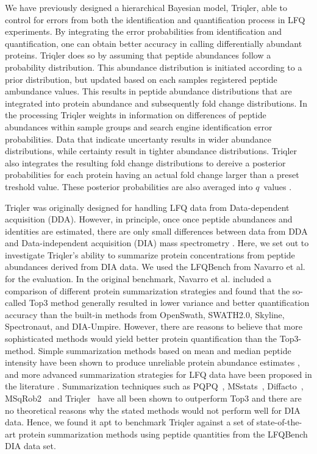 \documentclass[10pt,letterpaper]{article}
\begin{document}
We have previously designed a hierarchical Bayesian model, Triqler, able to control for errors from both the identification and quantification process in LFQ experiments\cite{the2019integrated}. By integrating the error probabilities from identification and quantification, one can obtain better accuracy in calling differentially abundant proteins. Triqler does so by assuming that peptide abundances follow a probability distribution. This abundance distribution is initiated according to a prior distribution, but updated based on each samples registered peptide ambundance values. This results in peptide abundance distributions that are integrated into protein abundance and subsequently fold change distributions. In the processing Triqler weights in information on differences of peptide abundances within sample groups and search engine identification error probabilities. Data that indicate uncertanty results in wider abundance distributions, while certainty result in tighter abundance distributions. Triqler also integrates the resulting fold change distributions to dereive a posterior probabilities for each protein having an actual fold change larger than a preset treshold value. These posterior probabilities are also averaged into $q$~values \cite{the2019integrated}.

Triqler was originally designed for handling LFQ data from Data-dependent acquisition (DDA). However, in principle, once once peptide abundances and identities are estimated, there are only small differences between data from DDA and Data-independent acquisition (DIA) mass spectrometry \cite{venable2004automated}. Here, we set out to investigate Triqler's ability to summarize protein concentrations from peptide abundances derived from DIA data. We used the LFQBench from Navarro et al. \cite{navarro2016multicenter} for the evaluation. In the original benchmark, Navarro et al. included a comparison of different protein summarization strategies and found that the so-called Top3 method generally resulted in lower variance and better quantification accuracy than the built-in methods from OpenSwath, SWATH2.0, Skyline, Spectronaut, and DIA-Umpire\cite{navarro2016multicenter}. However, there are reasons to believe that more sophisticated methods would yield better protein quantification than the Top3-method. Simple summarization methods based on mean and median peptide intensity have been shown to produce unreliable protein abundance estimates \cite{goeminne2015summarization}, and more advanced summarization strategies for LFQ data have been proposed in the literature \cite{silva2006absolute,cox2014accurate}. Summarization techniques such as PQPQ~\cite{forshed2011enhanced}, MSstats~\cite{choi2014msstats}, Diffacto~\cite{zhang2017covariation}, MSqRob2~\cite{sticker2020robust} and Triqler~\cite{the2019integrated} have all been shown to outperform Top3 and there are no theoretical reasons why the stated methods would not perform well for DIA data. Hence, we found it apt to benchmark Triqler against a set of state-of-the-art protein summarization methods using peptide quantities from the LFQBench DIA data set.
 
\end{document}
